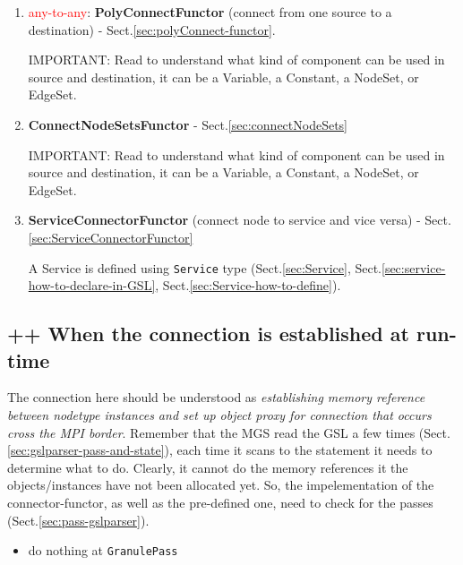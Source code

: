 \begin{enumerate}

  \item \textcolor{red}{any-to-any}: {\bf PolyConnectFunctor} (connect from one
  source to a destination) - Sect.\ref{sec:polyConnect-functor}.

IMPORTANT: Read to understand what kind of component can be used in source and
destination, it can be a Variable, a Constant, a NodeSet, or EdgeSet.

  \item {\bf ConnectNodeSetsFunctor} - Sect.\ref{sec:connectNodeSets}
  
IMPORTANT: Read to understand what kind of component can be used in source and
destination, it can be a Variable, a Constant, a NodeSet, or EdgeSet.
    
  \item {\bf ServiceConnectorFunctor} (connect node to service and vice versa) -
  Sect.\ref{sec:ServiceConnectorFunctor}
  
  A Service is defined using \verb!Service! type (Sect.\ref{sec:Service},
  Sect.\ref{sec:service-how-to-declare-in-GSL},
  Sect.\ref{sec:Service-how-to-define}).
  
\end{enumerate}
  


\subsection{++ When the connection is established at run-time}
\label{sec:connector-established-connection}
\label{sec:established-connection-via-connector-functor}

The connection here should be understood as {\it establishing memory reference
between nodetype instances and set up object proxy for connection that
occurs cross the MPI border}. 
Remember that the MGS read the GSL a few times
(Sect.\ref{sec:gslparser-pass-and-state}), each time it scans to the statement
it needs to determine what to do. Clearly, it cannot do the memory references it
the objects/instances have not been allocated yet.
So, the impelementation of the connector-functor, as well as the pre-defined
one, need to check for the passes (Sect.\ref{sec:pass-gslparser}).
\begin{itemize}
  \item do nothing at \verb!GranulePass! 
  
\end{itemize}


